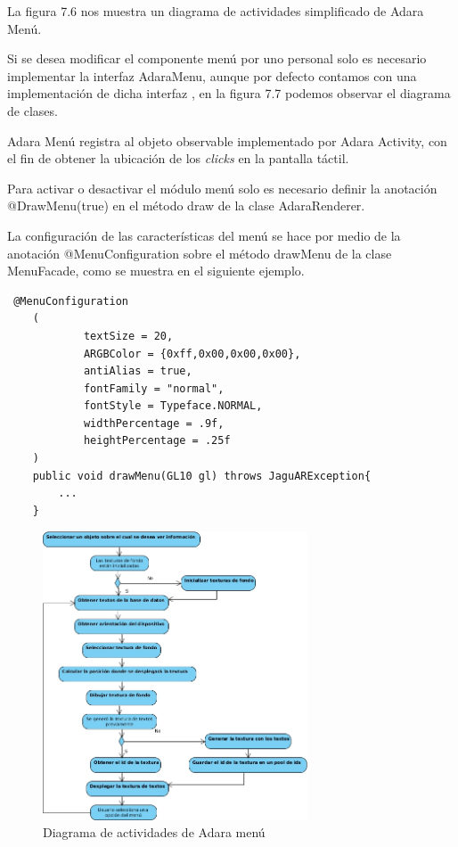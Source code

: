 \documentclass[12pt,a4paper,spanish,openany]{book}
\begin{document}
La figura 7.6 nos muestra un diagrama de actividades simplificado de Adara
Menú.



Si se desea modificar el componente menú por uno personal solo es necesario
implementar la interfaz AdaraMenu, aunque por defecto contamos con una
implementación de dicha interfaz , en la figura 7.7 podemos observar el diagrama
de clases.





Adara Menú registra al objeto observable implementado por Adara Activity, con
el fin de obtener la ubicación de los \emph{clicks} en la pantalla táctil.
 
 Para activar o desactivar el módulo menú solo es necesario definir la anotación
 @DrawMenu(true) en el método draw de la clase AdaraRenderer.


La configuración de las características del menú se hace por medio de la
anotación  @MenuConfiguration sobre el método drawMenu de la clase MenuFacade,
como se muestra en el siguiente ejemplo.


\newpage
\begin{verbatim}
 @MenuConfiguration
    (
            textSize = 20,  
            ARGBColor = {0xff,0x00,0x00,0x00},
            antiAlias = true,
            fontFamily = "normal",
            fontStyle = Typeface.NORMAL,
            widthPercentage = .9f,
            heightPercentage = .25f         
    )
    public void drawMenu(GL10 gl) throws JaguARException{
        ...
    }
    \end{verbatim}


\begin{figure}[ht]
\begin{center}
 \includegraphics[width=0.7\textwidth]{./img/menuActivity.jpg}
\caption{Diagrama de actividades de Adara menú}
\end{center}
\end{figure}
\end{document}

